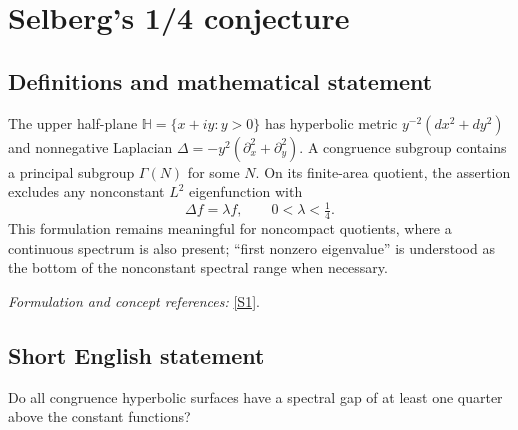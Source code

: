 \documentclass[11pt]{article}
\newcommand{\sref}[2]{\hyperlink{source:#1:#2}{[S#2]}}
\newif\ifshowcatalogue
\newcommand{\cataloguescope}[1]{\ifshowcatalogue
 \paragraph{Exact scope in the supplied catalogue.}
 \begin{quote}\small #1\end{quote}\fi}
\begin{document}
\setcounter{section}{0}
\clearpage
\section*{\texorpdfstring{Selberg's 1/4 conjecture}{Selberg's 1/4 conjecture}}\label{statement}
\subsection{Definitions and mathematical statement}
The upper half-plane $\mathbb H=\{x+iy:y>0\}$ has hyperbolic metric $y^{-2}(dx^2+dy^2)$ and nonnegative Laplacian $\Delta=-y^2(\partial_x^2+\partial_y^2)$. A congruence subgroup contains a principal subgroup $\Gamma(N)$ for some $N$. On its finite-area quotient, the assertion excludes any nonconstant $L^2$ eigenfunction with
\[
 \Delta f=\lambda f,\qquad0<\lambda<\tfrac14.
\]
This formulation remains meaningful for noncompact quotients, where a continuous spectrum is also present; ``first nonzero eigenvalue'' is understood as the bottom of the nonconstant spectral range when necessary.
\par\smallskip\textit{Formulation and concept references:} \sref{statement}{1}.
\cataloguescope{Prove that the first nonzero eigenvalue lambda\_1 of the Laplace-Beltrami operator on every congruence quotient of the upper half-plane is at least 1/4.}

\subsection{Short English statement}
Do all congruence hyperbolic surfaces have a spectral gap of at least one quarter above the constant functions?
\end{document}

